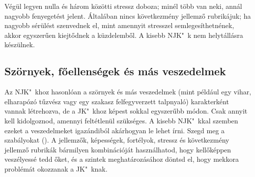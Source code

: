 Végül legyen nulla és három közötti stressz doboza; minél több van neki, annál nagyobb fenyegetést jelent. Általában nincs következmény jellemző rubrikájuk; ha nagyobb sérülést szenvednek el, mint amennyit stresszel semlegesíthetnének, akkor egyszerűen kiejtődnek a küzdelemből. A kisebb NJK"~k nem helytállásra készülnek.

\subsection{Szörnyek, főellenségek és más veszedelmek}

Az NJK"~khoz hasonlóan a szörnyek és más veszedelmek (mint például egy vihar, elharapózó tűzvész vagy egy szakasz felfegyverzett talpnyaló) karakterként vannak létrehozva, de a JK"~khoz képest sokkal egyszerűbb módon. Csak annyit kell kidolgoznod, amennyi feltétlenül szükséges. A kisebb NJK"~kkal szemben ezeket a veszedelmeket igazándiból akárhogyan le lehet írni. Szegd meg a szabályokat (). A jellemzők, képességek, fortélyok, stressz és következmény jellemző rubrikák bármilyen kombinációját használhatod, hogy kellőképpen veszélyessé tedd őket, és a szintek meghatározásához döntsd el, hogy mekkora problémát okozzanak a JK"~knak.
